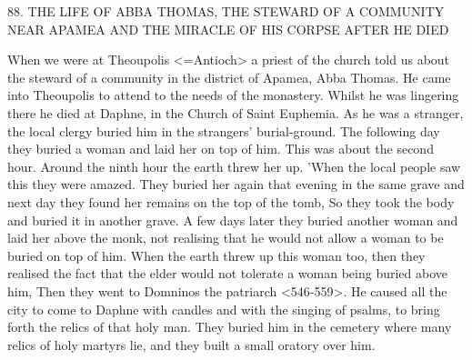88. THE LIFE OF ABBA THOMAS, THE STEWARD OF
A COMMUNITY NEAR APAMEA AND THE MIRACLE
OF HIS CORPSE AFTER HE DIED

When we were at Theoupolis <=Antioch> a priest of the church
told us about the steward of a community in the district of Apamea,
Abba Thomas. He came into Theoupolis to attend to the needs of
the monastery. Whilst he was lingering there he died at Daphne, in
the Church of Saint Euphemia. As he was a stranger, the local
clergy buried him in the strangers' burial-ground. The following day
they buried a woman and laid her on top of him. This was about
the second hour. Around the ninth hour the earth threw her up.
'When the local people saw this they were amazed. They buried her
again that evening in the same grave and next day they found her
remains on the top of the tomb, So they took the body and buried
it in another grave. A few days later they buried another woman
and laid her above the monk, not realising that he would not allow
a woman to be buried on top of him. When the earth threw up this
woman too, then they realised the fact that the elder would not
tolerate a woman being buried above him, Then they went to
Domninos the patriarch <546-559>. He caused all the city to come
to Daphne with candles and with the singing of psalms, to bring
forth the relics of that holy man. They buried him in the cemetery
where many relics of holy martyrs lie, and they built a small oratory
over him.

